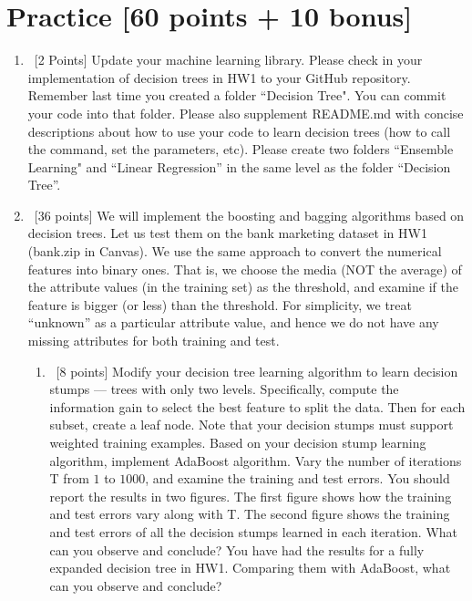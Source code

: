 \documentclass[12pt, fullpage,letterpaper]{article}
\begin{document}
\section{Practice [60 points + 10 bonus]}
\begin{enumerate}
	\item~[2 Points] Update your machine learning library. Please check in your implementation of decision trees in HW1 to your GitHub repository. Remember last time you created a folder ``Decision Tree". You can commit your code into that folder. Please also supplement README.md with concise descriptions about how to use your code to learn decision trees (how to call the command, set the parameters, etc). Please create two folders ``Ensemble Learning" and ``Linear Regression''  in the same level as the folder ``Decision Tree''.  


\item~[36 points] We will implement the boosting and bagging algorithms based on decision trees.  Let us test them on the bank marketing dataset in HW1 (bank.zip in Canvas). We use the same approach to convert the numerical features into binary ones. That is, we choose the media (NOT the average) of the attribute values (in the training set) as the threshold, and examine if the feature is bigger (or less) than the threshold.  For simplicity, we treat ``unknown'' as a particular attribute value, and hence we do not have any missing attributes for both training and test.
\begin{enumerate}
	\item~[8 points] Modify your decision tree learning algorithm to learn decision stumps ---  trees with only two levels. Specifically, compute the information gain to select the best feature to split the data. Then for each subset, create a leaf node. Note that your decision stumps must support weighted training examples. Based on your decision stump learning algorithm, implement AdaBoost algorithm. Vary the number of iterations T from $1$ to $1000$, and examine the training and test errors. You should report the results in two figures. The first figure shows how the training and test errors vary along with T. The second figure shows the training and test errors of all the decision stumps learned in each iteration. What can you observe and conclude? You have had the results for a fully expanded decision tree in HW1. Comparing them with AdaBoost, what can you observe and conclude?
	

\end{enumerate}
\end{enumerate}
\end{document}
